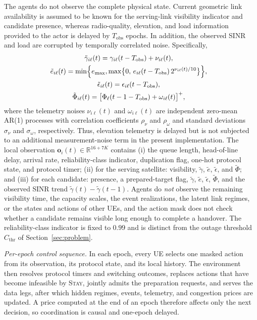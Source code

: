 \documentclass[journal]{IEEEtran}
\begin{document}
The agents do not observe the complete physical state. Current geometric link
availability is assumed to be known for the serving-link visibility indicator
and candidate presence, whereas radio-quality, elevation, and load information
provided to the actor is delayed by $T_{\mathrm{obs}}$ epochs. In addition,
the observed SINR and load are corrupted by temporally correlated noise.
Specifically,
\begin{gather}
\tilde\gamma_{i\ell}(t)=\gamma_{i\ell}(t-T_{\mathrm{obs}})+\nu_{i\ell}(t),
\label{eq:telemetry}\\
\tilde e_{i\ell}(t)=\min\!\Big\{e_{\max},\max\!\big\{0,\,e_{i\ell}(t-T_{\mathrm{obs}})\,2^{\nu_{i\ell}(t)/10}\big\}\Big\},\notag\\
\tilde\epsilon_{i\ell}(t)=\epsilon_{i\ell}(t-T_{\mathrm{obs}}),\notag\\
\tilde\Phi_{i\ell}(t)=\big[\Phi_\ell(t-1-T_{\mathrm{obs}})+\omega_{i\ell}(t)\big]^+,\notag
\end{gather}
where the telemetry noises $\nu_{i\ell}(t)$ and $\omega_{i\ell}(t)$ are
independent zero-mean AR(1) processes with correlation coefficients
$\rho_\nu$ and $\rho_\omega$ and standard deviations $\sigma_\nu$ and
$\sigma_\omega$, respectively. Thus, elevation telemetry is delayed but is not
subjected to an additional measurement-noise term in the present
implementation. The local observation $\mathbf{o}_i(t)\in\mathbb{R}^{16+7K}$
contains (i) the queue length, head-of-line delay, arrival rate,
reliability-class indicator, duplication flag, one-hot protocol state, and
protocol timer; (ii) for the serving satellite: visibility, $\tilde\gamma$,
$\tilde e$, $\tilde\epsilon$, and $\tilde\Phi$; and (iii) for each candidate:
presence, a prepared-target flag, $\tilde\gamma$, $\tilde e$,
$\tilde\epsilon$, $\tilde\Phi$, and the observed SINR trend
$\tilde\gamma(t)-\tilde\gamma(t-1)$. Agents do \emph{not} observe the
remaining visibility time, the capacity scales, the event realizations, the
latent link regimes, or the states and actions of other UEs, and the action
mask does not check whether a candidate remains visible long enough to
complete a handover. The reliability-class indicator is fixed to $0.99$ and is
distinct from the outage threshold $C_{\mathrm{thr}}$ of
Section~\ref{sec:problem}.

\emph{Per-epoch control sequence.} In each epoch, every UE selects one masked
action from its observation, its protocol state, and its local history. The
environment then resolves protocol timers and switching outcomes, replaces
actions that have become infeasible by \textsc{Stay}, jointly admits the
preparation requests, and serves the data legs, after which hidden regimes,
events, telemetry, and congestion prices are updated. A price computed at the
end of an epoch therefore affects only the next decision, so coordination is
causal and one-epoch delayed.
\end{document}

